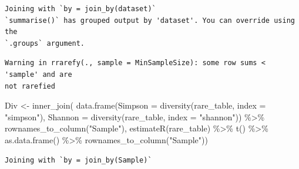 \documentclass[
  letterpaper,
  DIV=11,
  numbers=noendperiod]{scrartcl}
\newenvironment{Shaded}{\begin{snugshade}}{\end{snugshade}}
\newcommand{\AttributeTok}[1]{\textcolor[rgb]{0.40,0.45,0.13}{#1}}
\newcommand{\FunctionTok}[1]{\textcolor[rgb]{0.28,0.35,0.67}{#1}}
\newcommand{\NormalTok}[1]{\textcolor[rgb]{0.00,0.23,0.31}{#1}}
\newcommand{\OtherTok}[1]{\textcolor[rgb]{0.00,0.23,0.31}{#1}}
\newcommand{\SpecialCharTok}[1]{\textcolor[rgb]{0.37,0.37,0.37}{#1}}
\newcommand{\StringTok}[1]{\textcolor[rgb]{0.13,0.47,0.30}{#1}}
\begin{document}
\begin{verbatim}
Joining with `by = join_by(dataset)`
`summarise()` has grouped output by 'dataset'. You can override using the
`.groups` argument.
\end{verbatim}

\begin{verbatim}
Warning in rrarefy(., sample = MinSampleSize): some row sums < 'sample' and are
not rarefied
\end{verbatim}

\begin{Shaded}
\begin{Highlighting}[]
\NormalTok{Div }\OtherTok{\textless{}{-}} \FunctionTok{inner\_join}\NormalTok{(}
  \FunctionTok{data.frame}\NormalTok{(}\AttributeTok{Simpson =} \FunctionTok{diversity}\NormalTok{(rare\_table, }\AttributeTok{index =} \StringTok{"simpson"}\NormalTok{),}
            \AttributeTok{Shannon =} \FunctionTok{diversity}\NormalTok{(rare\_table, }\AttributeTok{index =} \StringTok{"shannon"}\NormalTok{)) }\SpecialCharTok{\%\textgreater{}\%} 
    \FunctionTok{rownames\_to\_column}\NormalTok{(}\StringTok{"Sample"}\NormalTok{),}
        \FunctionTok{estimateR}\NormalTok{(rare\_table) }\SpecialCharTok{\%\textgreater{}\%} 
    \FunctionTok{t}\NormalTok{() }\SpecialCharTok{\%\textgreater{}\%}
    \FunctionTok{as.data.frame}\NormalTok{() }\SpecialCharTok{\%\textgreater{}\%}  
    \FunctionTok{rownames\_to\_column}\NormalTok{(}\StringTok{"Sample"}\NormalTok{))}
\end{Highlighting}
\end{Shaded}

\begin{verbatim}
Joining with `by = join_by(Sample)`
\end{verbatim}
\end{document}
